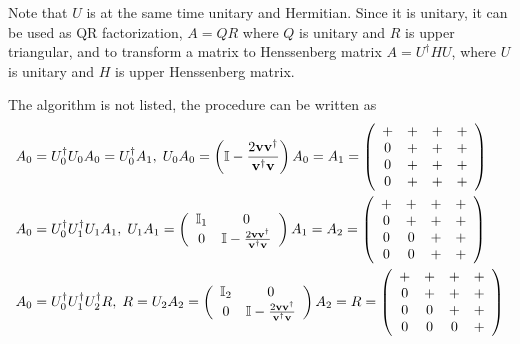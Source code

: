 Note that $U$ is at the same time unitary and Hermitian. Since it is unitary, it can be used as QR factorization, $A=QR$ where $Q$ is unitary and $R$ is upper triangular, and to transform a matrix to Henssenberg matrix $A=U^{\dagger}HU$, where $U$ is unitary and $H$ is upper Henssenberg matrix.

The algorithm is not listed, the procedure can be written as
\begin{equation}
\begin{split}
&A_0=U_0^{\dagger}U_0A_0=U_0^{\dagger}A_1,\;U_0A_0= \left(\mathbb{I}-\frac{2{\bf v}{\bf v}^{\dagger}}{{\bf v}^{\dagger}{\bf v}}\right)A_0=A_1=\left(\begin{array}{cccc}
+ & + & + & + \\ 0 & + & + & + \\ 0 & + & + & + \\ 0 & + & + & +\end{array}\right)\\
&A_0=U_0^{\dagger}U_1^{\dagger}U_1A_1,\; U_1A_1=\left(\begin{array}{cc}\mathbb{I}_1 & 0 \\ 0 & \mathbb{I}-\frac{2{\bf v}{\bf v}^{\dagger}}{{\bf v}^{\dagger}{\bf v}} \end{array}\right)A_1=A_2=\left(\begin{array}{cccc}
+ & + & + & + \\ 0 & + & + & + \\ 0 & 0 & + & + \\ 0 & 0 & + & +\end{array}\right)\\
&A_0=U_0^{\dagger}U_1^{\dagger}U_2^{\dagger}R,\; R=U_2A_2=\left(\begin{array}{cc}\mathbb{I}_2 & 0 \\ 0 & \mathbb{I}-\frac{2{\bf v}{\bf v}^{\dagger}}{{\bf v}^{\dagger}{\bf v}} \end{array}\right)A_2=R=\left(\begin{array}{cccc}
+ & + & + & + \\ 0 & + & + & + \\ 0 & 0 & + & + \\ 0 & 0 & 0 & +\end{array}\right)\\
\end{split}
\end{equation}

